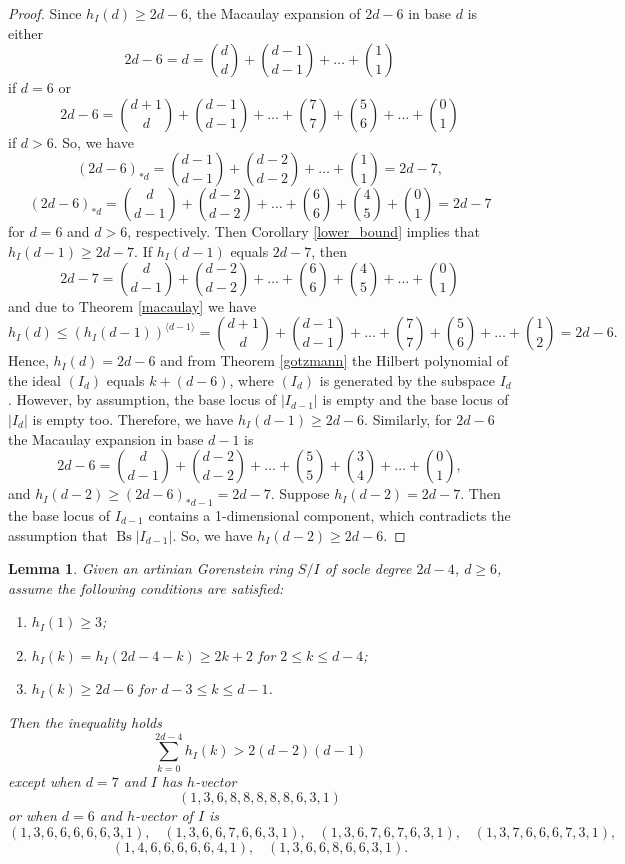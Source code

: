 \documentclass[a4paper,11pt,english,german]{amsart}
\DeclareMathOperator{\Bs}{Bs}
\newtheorem{lem}[thm]{Lemma}
\theoremstyle{definition}
\begin{document}
\begin{proof}
 Since $h_I(d)\geqslant 2d-6$, the Macaulay expansion of $2d-6$ in base $d$ is either
 $$2d-6=d=\binom{d}{d}+\binom{d-1}{d-1}+\dots +\binom{1}{1}$$
 if $d=6$ or
 $$ 2d-6=\binom{d+1}{d}+\binom{d-1}{d-1}+\dots+\binom{7}{7}+\binom{5}{6}+\dots+\binom{0}{1}$$
 if $d>6$. So, we have 
 $$(2d-6)_{\ast d}=\binom{d-1}{d-1}+\binom{d-2}{d-2}+\dots+\binom{1}{1}=2d-7,$$
 $$(2d-6)_{\ast d}=\binom{d}{d-1}+\binom{d-2}{d-2}+\dots+\binom{6}{6}+\binom{4}{5}+\binom{0}{1}=2d-7$$
 for $d=6$ and $d>6$, respectively. Then Corollary \ref{lower_bound} implies that $h_I(d-1)\geqslant 2d-7$. If $h_I(d-1)$ equals $2d-7$, then 
 $$
2d-7=\binom{d}{d-1}+\binom{d-2}{d-2}+\dots+\binom{6}{6}+\binom{4}{5}+\dots+\binom{0}{1}$$
 and due to Theorem \ref{macaulay} we have
 $$h_I(d)\leqslant(h_I(d-1))^{\langle d-1\rangle}=\binom{d+1}{d}+\binom{d-1}{d-1}+\dots+\binom{7}{7}+\binom{5}{6}+\dots+\binom{1}{2}=2d-6.$$
 Hence, $h_I(d)=2d-6$ and from Theorem \ref{gotzmann} the Hilbert polynomial of the ideal $(I_d)$ equals $k+(d-6)$, where $(I_d)$ is generated by the subspace $I_d$. However, by assumption, the base locus of $|I_{d-1}|$ is empty and the base locus of $|I_d|$ is empty too. Therefore, we have $h_I(d-1)\geqslant 2d-6$. Similarly, 
 	for $2d-6$ the Macaulay expansion in base $d-1$ is
 	$$2d-6=\binom{d}{d-1}+\binom{d-2}{d-2}+\dots+\binom{5}{5}+\binom{3}{4}+\dots+\binom{0}{1},$$
 	and $h_I(d-2)\geqslant (2d-6)_{\ast d-1}=2d-7$. Suppose $h_I(d-2)=2d-7$. Then the base locus of $I_{d-1}$ contains a 1-dimensional component, which contradicts the assumption that $\Bs|I_{d-1}|$. So, we have $h_I(d-2)\geqslant 2d-6$.
\end{proof}

\begin{lem}\label{auxiliary_cii}
		Given an artinian Gorenstein ring $S/I$ of socle degree $2d-4$, $d\geqslant 6$, assume the following conditions are satisfied:
		\begin{enumerate}
		\item[\emph{(1)}] $h_I(1)\geqslant 3$;
		\item[\emph{(2)}] $h_I(k)=h_I(2d-4-k)\geqslant 2k+2$ for $2\leqslant k \leqslant d-4$;
		\item[\emph{(3)}]  $h_I(k)\geqslant 2d-6$ for $d-3\leqslant k \leqslant d-1$.
		\end{enumerate}
		Then the inequality holds
		\begin{equation}\label{inequality_for_singularities}\tag{4.2}
			 \sum\limits_{k=0}^{2d-4} h_I(k)>2(d-2)(d-1)
		\end{equation}
		except when $d= 7$ and $I$ has $h$-vector
		$$(1,3,6,8,8,8,8,8,6,3,1)$$
		or when $d=6$ and $h$-vector of $I$ is
		$$(1,3,6,6,6,6,6,3,1),\hspace{10pt} (1,3,6,6,7,6,6,3,1), \hspace{10pt}(1,3,6,7,6,7,6,3,1), \hspace{10pt} (1,3,7,6,6,6,7,3,1), $$
		 $$(1,4,6,6,6,6,6,4,1), \hspace{10pt} (1,3,6,6,8,6,6,3,1).$$
\end{lem}
\end{document}
